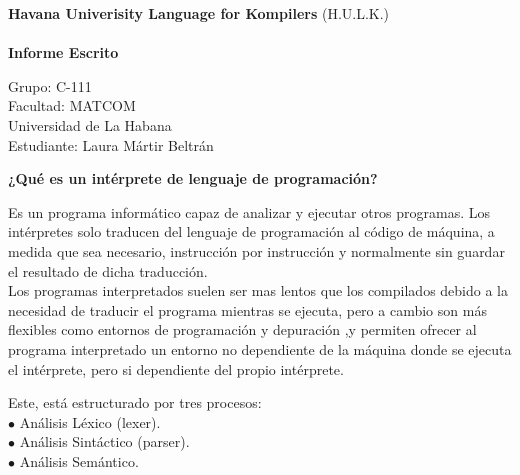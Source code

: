 \documentclass[12pt,a4paper]{article}
\author{LauraMartirBeltranC113}
\begin{document}
\begin{Huge}

\begin{center}

\textbf{Havana Univerisity Language for Kompilers} (H.U.L.K.)\\\\

\textbf{Informe Escrito}

\end{center}

\begin{center}
Grupo: C-111\\
Facultad: MATCOM \\
Universidad de La Habana\\
Estudiante: Laura Mártir Beltrán
\end{center}

\end{Huge}

\begin{LARGE}

\begin{center}
\textbf{¿Qué es un intérprete de lenguaje de programación?}

\end{center}

\begin{flushleft}
Es un programa informático capaz de analizar y ejecutar otros programas. Los intérpretes solo traducen del lenguaje de programación al código de máquina, a medida que sea necesario, instrucción por instrucción y normalmente sin guardar el resultado de dicha traducción.\\
Los programas interpretados suelen ser mas lentos que los compilados debido a la necesidad de traducir el programa mientras se ejecuta, pero a cambio son más flexibles como entornos de programación y depuración ,y permiten ofrecer al programa interpretado un entorno no dependiente de la máquina donde se ejecuta el intérprete, pero si dependiente del propio intérprete.
\end{flushleft}

\begin{flushleft}
Este, está estructurado por tres procesos:\\

$\bullet$ Análisis Léxico (lexer).\\
$\bullet$ Análisis Sintáctico (parser).\\
$\bullet$ Análisis Semántico.

\end{flushleft}

\end{LARGE}
\end{document}
